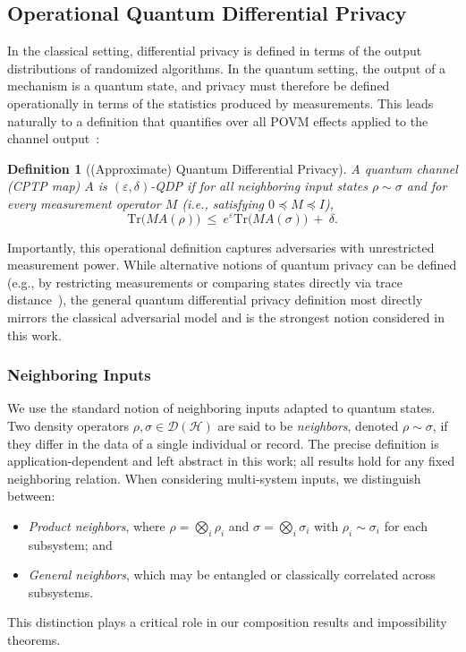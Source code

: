 \documentclass[11pt]{article}
\def\Tr{\mathrm{Tr}}
\theoremstyle{plain}
\newtheorem{definition}[theo]{Definition}
\theoremstyle{remark}
\begin{document}
\subsection{Operational Quantum Differential Privacy}

In the classical setting, differential privacy is defined in terms of the output distributions of randomized algorithms.
In the quantum setting, the output of a mechanism is a quantum state, and privacy must therefore be defined operationally in terms of the statistics produced by measurements.
This leads naturally to a definition that quantifies over all POVM effects applied to the channel output~\citep{QDP_computation17,hirche2022quantum}:

\begin{definition}[(Approximate) Quantum Differential Privacy]
\label{def:qdp-povm}
A quantum channel (CPTP map) $A$ is \emph{$(\varepsilon,\delta)$-QDP} if for all neighboring
input states $\rho\sim\sigma$ and for every measurement operator $M$
(i.e., satisfying $0\preceq M\preceq I$),
\begin{equation}
\Tr\!\big(MA(\rho)\big)\ \le\ e^{\varepsilon}\Tr\!\big(MA(\sigma)\big)\ +\ \delta.
\end{equation}
\end{definition}
Importantly, this operational definition captures adversaries with unrestricted measurement power.
While alternative notions of quantum privacy can be defined (e.g., by restricting measurements or comparing states directly via trace distance~\cite{NuradhaGW24}), the general quantum differential privacy definition most directly mirrors the classical adversarial model and is the strongest notion considered in this work.

\subsubsection{Neighboring Inputs}

We use the standard notion of neighboring inputs adapted to quantum states.
Two density operators $\rho,\sigma \in \mathcal{D}(\mathcal{H})$ are said to be \emph{neighbors}, denoted $\rho \sim \sigma$, if they differ in the data of a single individual or record.
The precise definition is application-dependent and left abstract in this work; all results hold for any fixed neighboring relation.
When considering multi-system inputs, we distinguish between:
\begin{itemize}
  \item \emph{Product neighbors}, where $\rho=\bigotimes_i \rho_i$ and $\sigma=\bigotimes_i \sigma_i$ with $\rho_i \sim \sigma_i$ for each subsystem; and
  \item \emph{General neighbors}, which may be entangled or classically correlated across subsystems.
\end{itemize}
This distinction plays a critical role in our composition results and impossibility theorems.
\end{document}
